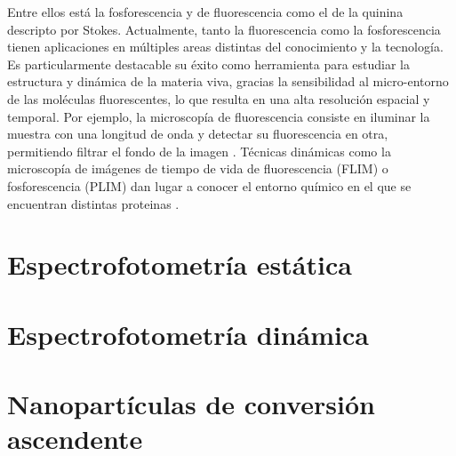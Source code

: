 Entre ellos está la fosforescencia  y de fluorescencia como el de la quinina descripto por Stokes.
Actualmente, tanto la fluorescencia como la fosforescencia tienen aplicaciones en múltiples areas distintas del conocimiento y la tecnología. 
Es particularmente destacable su éxito como herramienta para estudiar la estructura y dinámica de la materia viva, gracias la sensibilidad al micro-entorno de las moléculas fluorescentes, lo que resulta en una alta resolución espacial y temporal. 
Por ejemplo, la microscopía de fluorescencia consiste en iluminar la muestra con una longitud de onda y detectar su fluorescencia en otra, permitiendo filtrar el fondo de la imagen \cite{VALEUR}.
Técnicas dinámicas como la microscopía de imágenes de tiempo de vida de fluorescencia (FLIM) o fosforescencia (PLIM) dan lugar a conocer el entorno químico en el que se encuentran distintas proteinas \todo{[CITA]}.




\section{Espectrofotometría estática}
\section{Espectrofotometría dinámica} \label{sec:intro_tcspc}
\section{Nanopartículas de conversión ascendente} \label{sec:intro_ucnp}
